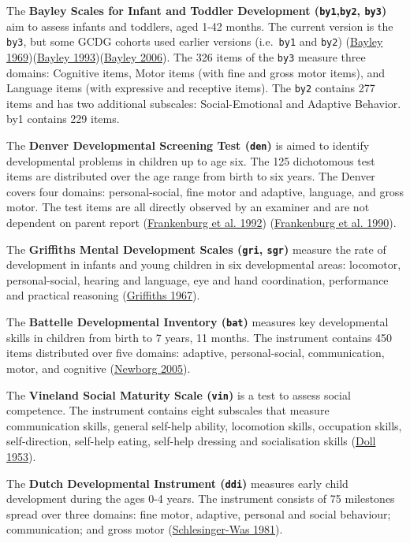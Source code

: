 \documentclass[
]{book}
\begin{document}
The \textbf{Bayley Scales for Infant and Toddler Development (\texttt{by1},\texttt{by2}, \texttt{by3})} aim to assess infants and toddlers, aged 1-42 months. The current version is the \texttt{by3}, but some GCDG cohorts used earlier versions (i.e.~\texttt{by1} and \texttt{by2}) (\protect\hyperlink{ref-bayley1969}{Bayley 1969})(\protect\hyperlink{ref-bayley1993}{Bayley 1993})(\protect\hyperlink{ref-bayley2006}{Bayley 2006}). The 326 items of the \texttt{by3} measure three domains: Cognitive items, Motor items (with fine and gross motor items), and Language items (with expressive and receptive items). The \texttt{by2} contains 277 items and has two additional subscales: Social-Emotional and Adaptive Behavior. by1 contains 229 items.

The \textbf{Denver Developmental Screening Test (\texttt{den})} is aimed to identify developmental problems in children up to age six. The 125 dichotomous test items are distributed over the age range from birth to six years. The Denver covers four domains: personal-social, fine motor and adaptive, language, and gross motor. The test items are all directly observed by an examiner and are not dependent on parent report (\protect\hyperlink{ref-frankenburg1992}{Frankenburg et al. 1992}) (\protect\hyperlink{ref-frankenburg1990}{Frankenburg et al. 1990}).

The \textbf{Griffiths Mental Development Scales (\texttt{gri}, \texttt{sgr})} measure the rate of development in infants and young children in six developmental areas: locomotor, personal-social, hearing and language, eye and hand coordination, performance and practical reasoning (\protect\hyperlink{ref-griffiths1967}{Griffiths 1967}).

The \textbf{Battelle Developmental Inventory (\texttt{bat})} measures key developmental skills in children from birth to 7 years, 11 months. The instrument contains 450 items distributed over five domains: adaptive, personal-social, communication, motor, and cognitive (\protect\hyperlink{ref-newborg2005}{Newborg 2005}).

The \textbf{Vineland Social Maturity Scale (\texttt{vin})} is a test to assess social competence. The instrument contains eight subscales that measure communication skills, general self-help ability, locomotion skills, occupation skills, self-direction, self-help eating, self-help dressing and socialisation skills (\protect\hyperlink{ref-doll1953}{Doll 1953}).

The \textbf{Dutch Developmental Instrument (\texttt{ddi})} measures early child development during the ages 0-4 years. The instrument consists of 75 milestones spread over three domains: fine motor, adaptive, personal and social behaviour; communication; and gross motor (\protect\hyperlink{ref-schlesinger1981}{Schlesinger-Was 1981}).
\end{document}
